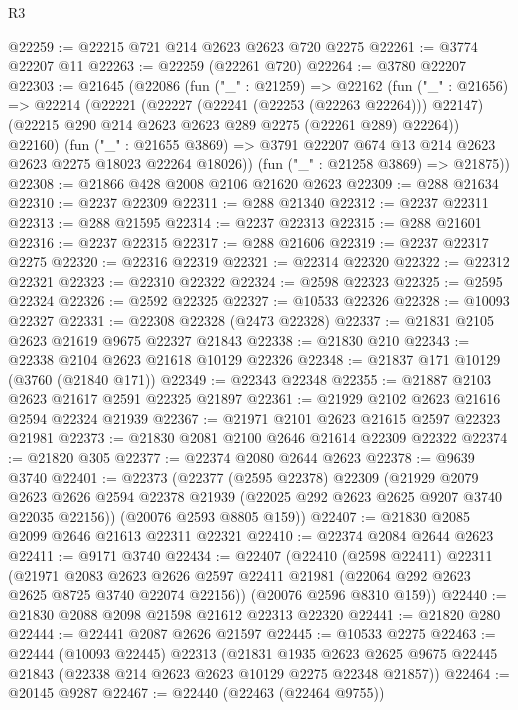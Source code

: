 \begin{lexlean}{R3}
\begin{coremodule}
@22259 := @22215 @721 @214 @2623 @2623 @720 @2275
@22261 := @3774 @22207 @11
@22263 := @22259 (@22261 @720)
@22264 := @3780 @22207
@22303 := @21645
    (@22086
      (fun ("_" : @21259) =>
      @22162
        (fun ("_" : @21656) =>
        @22214
          (@22221
            (@22227 (@22241 (@22253 (@22263 @22264))) @22147)
            (@22215 @290 @214 @2623 @2623 @289 @2275 (@22261 @289) @22264))
          @22160)
        (fun ("_" : @21655 @3869) =>
        @3791 @22207 @674 @13 @214 @2623 @2623 @2275 @18023 @22264 @18026))
      (fun ("_" : @21258 @3869) => @21875))
@22308 := @21866 @428 @2008 @2106 @21620 @2623
@22309 := @288 @21634
@22310 := @2237 @22309
@22311 := @288 @21340
@22312 := @2237 @22311
@22313 := @288 @21595
@22314 := @2237 @22313
@22315 := @288 @21601
@22316 := @2237 @22315
@22317 := @288 @21606
@22319 := @2237 @22317 @2275
@22320 := @22316 @22319
@22321 := @22314 @22320
@22322 := @22312 @22321
@22323 := @22310 @22322
@22324 := @2598 @22323
@22325 := @2595 @22324
@22326 := @2592 @22325
@22327 := @10533 @22326
@22328 := @10093 @22327
@22331 := @22308 @22328 (@2473 @22328)
@22337 := @21831 @2105 @2623 @21619 @9675 @22327 @21843
@22338 := @21830 @210
@22343 := @22338 @2104 @2623 @21618 @10129 @22326
@22348 := @21837 @171 @10129 (@3760 (@21840 @171))
@22349 := @22343 @22348
@22355 := @21887 @2103 @2623 @21617 @2591 @22325 @21897
@22361 := @21929 @2102 @2623 @21616 @2594 @22324 @21939
@22367 := @21971 @2101 @2623 @21615 @2597 @22323 @21981
@22373 := @21830 @2081 @2100 @2646 @21614 @22309 @22322
@22374 := @21820 @305
@22377 := @22374 @2080 @2644 @2623
@22378 := @9639 @3740
@22401 := @22373
    (@22377
      (@2595 @22378)
      @22309
      (@21929
        @2079
        @2623
        @2626
        @2594
        @22378
        @21939
        (@22025 @292 @2623 @2625 @9207 @3740 @22035 @22156))
      (@20076 @2593 @8805 @159))
@22407 := @21830 @2085 @2099 @2646 @21613 @22311 @22321
@22410 := @22374 @2084 @2644 @2623
@22411 := @9171 @3740
@22434 := @22407
    (@22410
      (@2598 @22411)
      @22311
      (@21971
        @2083
        @2623
        @2626
        @2597
        @22411
        @21981
        (@22064 @292 @2623 @2625 @8725 @3740 @22074 @22156))
      (@20076 @2596 @8310 @159))
@22440 := @21830 @2088 @2098 @21598 @21612 @22313 @22320
@22441 := @21820 @280
@22444 := @22441 @2087 @2626 @21597
@22445 := @10533 @2275
@22463 := @22444
    (@10093 @22445)
    @22313
    (@21831
      @1935
      @2623
      @2625
      @9675
      @22445
      @21843
      (@22338 @214 @2623 @2623 @10129 @2275 @22348 @21857))
@22464 := @20145 @9287
@22467 := @22440 (@22463 (@22464 @9755))

\end{coremodule}
\end{lexlean}
